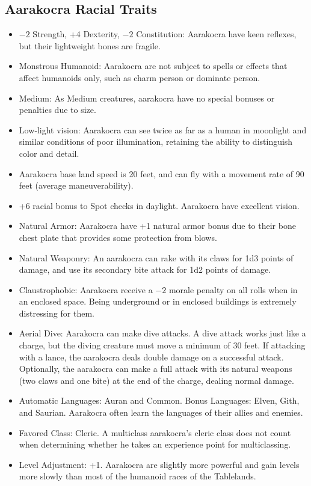 \subsection{Aarakocra Racial Traits}
\begin{itemize}
    \item $-2$ Strength, +4 Dexterity, $-2$ Constitution: Aarakocra have keen reflexes, but their lightweight bones are fragile.
    \item Monstrous Humanoid: Aarakocra are not subject to spells or effects that affect humanoids only, such as charm person or dominate person.
    \item Medium: As Medium creatures, aarakocra have no special bonuses or penalties due to size.
    \item Low‐light vision: Aarakocra can see twice as far as a human in moonlight and similar conditions of poor illumination, retaining the ability to distinguish color and detail.
    \item Aarakocra base land speed is 20 feet, and can fly with a movement rate of 90 feet (average maneuverability).
    \item +6 racial bonus to Spot checks in daylight. Aarakocra have excellent vision.
    \item Natural Armor: Aarakocra have +1 natural armor bonus due to their bone chest plate that provides some protection from blows.
    \item Natural Weaponry: An aarakocra can rake with its claws for 1d3 points of damage, and use its secondary bite attack for 1d2 points of damage.
    \item Claustrophobic: Aarakocra receive a $-2$ morale penalty on all rolls when in an enclosed space. Being underground or in enclosed buildings is extremely distressing for them.
    \item Aerial Dive: Aarakocra can make dive attacks. A dive attack works just like a charge, but the diving creature must move a minimum of 30 feet. If attacking with a lance, the aarakocra deals double damage on a successful attack. Optionally, the aarakocra can make a full attack with its natural weapons (two claws and one bite) at the end of the charge, dealing normal damage.
    \item Automatic Languages: Auran and Common. Bonus Languages: Elven, Gith, and Saurian. Aarakocra often learn the languages of their allies and enemies.
    \item Favored Class: Cleric. A multiclass aarakocra's cleric class does not count when determining whether he takes an experience point for multiclassing.
    \item Level Adjustment: +1. Aarakocra are slightly more powerful and gain levels more slowly than most of the humanoid races of the Tablelands.
\end{itemize}